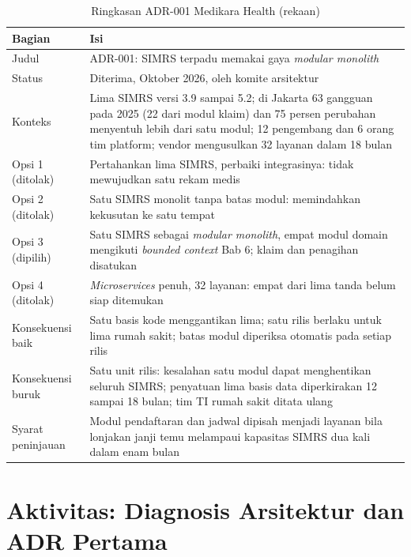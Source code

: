 \begin{table}[!htb]
  \centering
  \caption{Ringkasan ADR-001 Medikara Health (rekaan)}
  \label{tab:ch07-adr-simrs}
  \footnotesize
  \begin{tabularx}{\textwidth}{>{\raggedright\arraybackslash}p{2.3cm} >{\raggedright\arraybackslash}X}
    \hline
    \textbf{Bagian} & \textbf{Isi} \\ \hline
    Judul & ADR-001: SIMRS terpadu memakai gaya \textit{modular monolith} \\ \hline
    Status & Diterima, Oktober 2026, oleh komite arsitektur \\ \hline
    Konteks & Lima SIMRS versi 3.9 sampai 5.2; di Jakarta 63 gangguan pada 2025 (22 dari modul
      klaim) dan 75 persen perubahan menyentuh lebih dari satu modul; 12 pengembang dan 6 orang tim
      platform; vendor mengusulkan 32 layanan dalam 18 bulan \\ \hline
    Opsi 1 (ditolak) & Pertahankan lima SIMRS, perbaiki integrasinya: tidak mewujudkan satu rekam
      medis \\ \hline
    Opsi 2 (ditolak) & Satu SIMRS monolit tanpa batas modul: memindahkan kekusutan ke satu tempat \\
      \hline
    Opsi 3 (dipilih) & Satu SIMRS sebagai \textit{modular monolith}, empat modul domain mengikuti
      \textit{bounded context} Bab 6; klaim dan penagihan disatukan \\ \hline
    Opsi 4 (ditolak) & \textit{Microservices} penuh, 32 layanan: empat dari lima tanda belum siap
      ditemukan \\ \hline
    Konsekuensi baik & Satu basis kode menggantikan lima; satu rilis berlaku untuk lima rumah sakit;
      batas modul diperiksa otomatis pada setiap rilis \\ \hline
    Konsekuensi buruk & Satu unit rilis: kesalahan satu modul dapat menghentikan seluruh SIMRS;
      penyatuan lima basis data diperkirakan 12 sampai 18 bulan; tim TI rumah sakit ditata ulang \\
      \hline
    Syarat peninjauan & Modul pendaftaran dan jadwal dipisah menjadi layanan bila lonjakan janji
      temu melampaui kapasitas SIMRS dua kali dalam enam bulan \\ \hline
  \end{tabularx}
\end{table}

\section{Aktivitas: Diagnosis Arsitektur dan ADR Pertama}
\label{sec:ch07-aktivitas}


